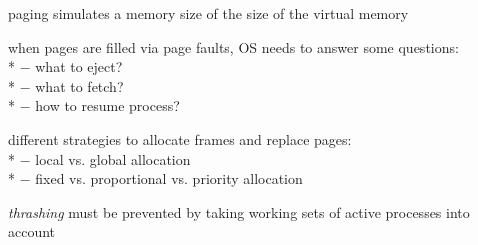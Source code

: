 \begin{summary}
  \begin{items}
    \item paging simulates a memory size of the size of the virtual memory
    \item when pages are filled via page faults, OS needs to answer some questions: \\*
      $ - $ what to eject? \\*
      $ - $ what to fetch? \\*
      $ - $ how to resume process?
    \item different strategies to allocate frames and replace pages: \\*
      $ - $ local vs. global allocation \\*
      $ - $ fixed vs. proportional vs. priority allocation
    \item \emph{thrashing} must be prevented by taking working sets of active processes into account
  \end{items}
\end{summary}